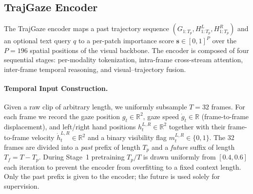 \subsection{TrajGaze Encoder}
\label{sec:encoder}

The TrajGaze encoder maps a past trajectory sequence
$(G_{1:T_p}, H^L_{1:T_p}, H^R_{1:T_p})$ and an optional text query $q$
to a per-patch importance score $\mathbf{s} \in [0,1]^{P}$
over the $P{=}196$ spatial positions of the visual backbone.
The encoder is composed of four sequential stages: per-modality tokenization,
intra-frame cross-stream attention, inter-frame temporal reasoning, and
visual--trajectory fusion.

\paragraph{Temporal Input Construction.}
Given a raw clip of arbitrary length, we uniformly subsample $T{=}32$ frames.
For each frame we record the gaze position $g_t \in \mathbb{R}^2$,
gaze speed $\dot{g}_t \in \mathbb{R}$ (frame-to-frame displacement),
and left/right hand positions $h_t^{L,R} \in \mathbb{R}^2$ together with
their frame-to-frame velocity $\dot{h}_t^{L,R} \in \mathbb{R}^2$ and a binary
visibility flag $m_t^{L,R} \in \{0,1\}$.
The 32 frames are divided into a \emph{past} prefix of length $T_p$ and a
\emph{future} suffix of length $T_f = T - T_p$.
During Stage~1 pretraining $T_p / T$ is drawn uniformly from $[0.4, 0.6]$ each
iteration to prevent the encoder from overfitting to a fixed context length.
Only the past prefix is given to the encoder; the future is used solely for supervision.


